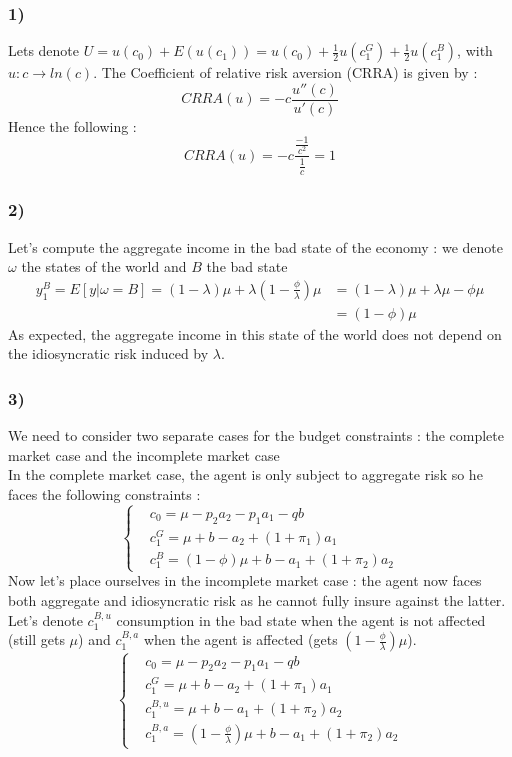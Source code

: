 \documentclass{article}
\begin{document}
\subsubsection{1)}
Lets denote $U = u(c_0)+E(u(c_1))  =u(c_0) + \frac{1}{2}u(c_1^G)+\frac{1}{2}u(c_1^B)$, with $u:c\xrightarrow{} ln(c)$.
The Coefficient of relative risk aversion (CRRA) is given by : $$CRRA(u) = -c\frac{u''(c)}{u'(c)}$$
Hence the following : 
$$CRRA (u) = -c\frac{\frac{-1}{c^2}}{\frac{1}{c}}=1$$

\subsubsection{2)}
Let's compute the aggregate income in the bad state of the economy : we denote $\omega$ the states of the world and $B$ the bad state 
$$\begin{aligned}y_1^B = E[y|\omega=B] = (1-\lambda)\mu+\lambda(1-\frac{\phi}{\lambda})\mu &= (1-\lambda)\mu + \lambda\mu - \phi \mu\\
&=(1-\phi )\mu
\end{aligned}$$
As expected, the aggregate income in this state of the world does not depend on the idiosyncratic risk induced by $\lambda$. 

\subsubsection{3)}
We need to consider two separate cases for the budget constraints : the complete market case and the incomplete market case\\
In the complete market case, the agent is only subject to aggregate risk so he faces the following constraints : 
$$\left\{\begin{aligned}
    &c_0 = \mu-p_2a_2-p_1a_1-qb\\
    &c_1^G= \mu +b-a_2+(1+\pi_1)a_1\\
    &c_1^B = (1-\phi)\mu + b -a_1+(1+\pi_2)a_2
\end{aligned}\right.$$
Now let's place ourselves in the incomplete market case : the agent now faces both aggregate and idiosyncratic risk as he cannot fully insure against the latter. Let's denote $c_1^{B,u}$ consumption in the bad state when the agent is not affected (still gets $\mu$) and $c_1^{B,a}$ when the agent is affected (gets $(1-\frac{\phi}{\lambda})\mu$).
$$\left\{\begin{aligned}
    &c_0 = \mu -p_2a_2-p_1a_1-qb\\
    &c_1^G = \mu + b-a_2+(1+\pi_1)a_1\\
    &c_1^{B,u} = \mu +b-a_1+(1+\pi_2)a_2\\
    &c_1^{B,a}= (1-\frac{\phi}{\lambda})\mu + b -a_1 + (1+\pi_2)a_2
\end{aligned}\right.$$
\end{document}
